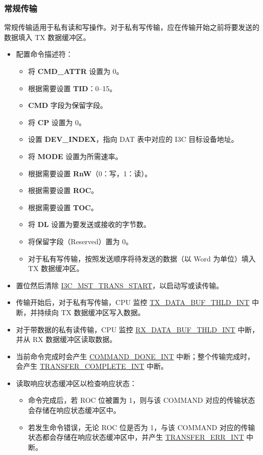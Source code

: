 \documentclass[main\_\_CN.tex]{subfiles}
\begin{document}
\subsubsection{常规传输}
常规传输适用于私有读和写操作。对于私有写传输，应在传输开始之前将要发送的数据填入 TX 数据缓冲区。

\begin{itemize}
    \item 配置命令描述符：
    \begin{itemize}
        \item 将 \textbf{CMD\_ATTR} 设置为 0。
        \item 根据需要设置 \textbf{TID}：0–15。
        \item \textbf{CMD} 字段为保留字段。
        \item 将 \textbf{CP} 设置为 0。
        \item 设置 \textbf{DEV\_INDEX}，指向 DAT 表中对应的 I3C 目标设备地址。
        \item 将 \textbf{MODE} 设置为所需速率。
        \item 根据需要设置 \textbf{RnW}（0：写，1：读）。
        \item 根据需要设置 \textbf{ROC}。
        \item 根据需要设置 \textbf{TOC}。
        \item 将 \textbf{DL} 设置为要发送或接收的字节数。
        \item 将保留字段（Reserved）置为 0。
        \item 对于私有写传输，按照发送顺序将待发送的数据（以 Word 为单位）填入 TX 数据缓冲区。
    \end{itemize}
    \item 置位然后清除 \hyperref[fielddesc:I3CMSTREGTRANSSTART]{I3C\_MST\_TRANS\_START}，以启动写或读传输。
    \item 传输开始后，对于私有写传输，CPU 监控 \hyperref[int:TXDATABUFTHLDINT]{TX\_DATA\_BUF\_THLD\_INT} 中断，并持续向 TX 数据缓冲区写入数据。
    \item 对于带数据的私有读传输，CPU 监控 \hyperref[int:RXDATABUFTHLDINT]{RX\_DATA\_BUF\_THLD\_INT} 中断，并从 RX 数据缓冲区读取数据。
    \item 当前命令完成时会产生 \hyperref[int:COMMANDDONEINT]{COMMAND\_DONE\_INT} 中断；整个传输完成时，会产生 \hyperref[int:TRANSFERCOMPLETEINT]{TRANSFER\_COMPLETE\_INT} 中断。
    \item 读取响应状态缓冲区以检查响应状态：
    \begin{itemize}
        \item 命令完成后，若 ROC 位被置为 1，则与该 COMMAND 对应的传输状态会存储在响应状态缓冲区中。
        \item 若发生命令错误，无论 ROC 位是否为 1，与该 COMMAND 对应的传输状态都会存储在响应状态缓冲区中，并产生 \hyperref[int:TRANSFERERRINT]{TRANSFER\_ERR\_INT} 中断。
    \end{itemize}
\end{itemize}
\end{document}
